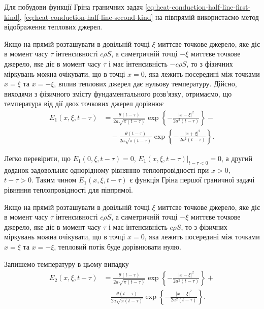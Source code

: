 \begin{solution}
	Для побудови функції Гріна граничних задач \eqref{eq:heat-conduction-half-line-first-kind}, \eqref{eq:heat-conduction-half-line-second-kind} на півпрямій використаємо метод відображення теплових джерел. \medskip

	Якщо на прямій розташувати в довільній точці $\xi$ миттєве точкове джерело, яке діє в момент часу $\tau$ інтенсивності $c \rho S$, а симетричній точці $-\xi$ миттєве точкове джерело, яке діє в момент часу $\tau$ і має інтенсивність $-c \rho S$, то з фізичних міркувань можна очікувати, що в точці $x = 0$, яка лежить посередині між точками $x = \xi$ та $x = - \xi$, вплив теплових джерел дає нульову температуру. Дійсно, виходячи з фізичного змісту фундаментального розв'язку, отримаємо, що температура від дії двох точкових джерел дорівнює 
	\begin{equation}
 		\begin{aligned}
			E_1(x, \xi, t - \tau) &= \frac{\theta(t - \tau)}{2 a \sqrt{\pi (t - \tau)}} \exp\left\{-\frac{|x-\xi|^2}{2a^2(t - \tau)}\right\} - \\
			& \quad - \frac{\theta(t - \tau)}{2 a \sqrt{\pi (t - \tau)}} \exp\left\{-\frac{|x+\xi|^2}{2a^2(t - \tau)}\right\}.
		\end{aligned}
	\end{equation}

	Легко перевірити, що $E_1(0, \xi, t - \tau) = 0$, $\left. E_1(x, \xi, t - \tau) \right|_{t - \tau < 0} = 0$, а другий доданок задовольняє однорідному рівнянню теплопровідності при $x > 0$, $t - \tau > 0$. Таким чином $E_1(x, \xi, t - \tau)$ є функція Гріна першої граничної задачі рівняння теплопровідності для півпрямої. \medskip

	Якщо на прямій розташувати в довільній точці $\xi$ миттєве точкове джерело, яке діє в момент часу $\tau$ інтенсивності $c \rho S$, а симетричній точці $-\xi$ миттєве точкове джерело, яке діє в момент часу $\tau$ і має інтенсивність $c \rho S$, то з фізичних міркувань можна очікувати, що в точці $x = 0$, яка лежить посередині між точками $x = \xi$ та $x = - \xi$, тепловий потік буде дорівнювати нулю. \medskip

	Запишемо температуру в цьому випадку 
	\begin{equation}
 		\begin{aligned}
			E_2(x, \xi, t - \tau) &= \frac{\theta(t - \tau)}{2 a \sqrt{\pi (t - \tau)}} \exp\left\{-\frac{|x-\xi|^2}{2a^2(t - \tau)}\right\} + \\
			& \quad \frac{\theta(t - \tau)}{2 a \sqrt{\pi (t - \tau)}} \exp\left\{-\frac{|x+\xi|^2}{2a^2(t - \tau)}\right\}.
		\end{aligned}
	\end{equation}


\end{solution}
